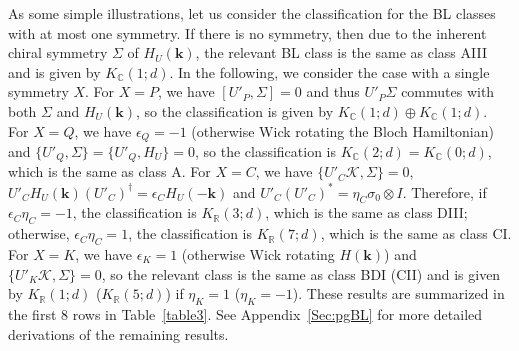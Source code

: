 \documentclass{tADP2e}
\theoremstyle{plain}
\theoremstyle{plain}
\theoremstyle{definition}
\begin{document}
As some simple illustrations, let us consider the classification for the BL classes with at most one symmetry. If there is no symmetry, then due to the inherent chiral symmetry $\Sigma$ of $H_U(\boldsymbol{k})$, the relevant BL class is the same as class AIII and is given by $K_{\mathbb{C}}(1;d)$. In the following, we consider the case with a single symmetry $X$. For $X=P$, we have $[U'_P,\Sigma]=0$ and thus $U'_P\Sigma$ %
commutes with both $\Sigma$ and $H_U(\boldsymbol{k})$, so the classification is given by $K_{\mathbb{C}}(1;d)\oplus K_{\mathbb{C}}(1;d)$. For $X=Q$, we have $\epsilon_Q=-1$ (otherwise Wick rotating the Bloch Hamiltonian) and $\{U'_Q,\Sigma\}=\{U'_Q,H_U\}=0$, so the classification is $K_{\mathbb{C}}(2;d)=K_{\mathbb{C}}(0;d)$, which is the same as class A. For $X=C$, we have $\{U'_C\mathcal{K},\Sigma\}=0$, $U'_CH_U(\boldsymbol{k})(U'_C)^\dag=\epsilon_CH_U(-\boldsymbol{k})$ and $U'_C(U'_C)^*=\eta_C\sigma_0\otimes I$. Therefore, if $\epsilon_C\eta_C=-1$, the classification is $K_{\mathbb{R}}(3;d)$, which is the same as class DIII; %
otherwise, $\epsilon_C\eta_C=1$, the classification is $K_{\mathbb{R}}(7;d)$, which is the same as class CI. %
For $X=K$, we have $\epsilon_K=1$ (otherwise Wick rotating $H(\boldsymbol{k})$) and $\{U'_K\mathcal{K},\Sigma\}=0$, so the relevant class is the same as class BDI (CII) and is given by $K_{\mathbb{R}}(1;d)$ ($K_{\mathbb{R}}(5;d)$) if $\eta_K=1$ ($\eta_K=-1$). These results are summarized in the first $8$ rows in Table~\ref{table3}. See Appendix~\ref{Sec:pgBL} for more detailed derivations of the remaining results.
\end{document}
